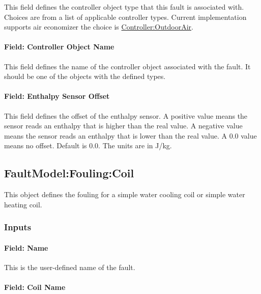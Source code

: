 This field defines the controller object type that this fault is associated with. Choices are from a list of applicable controller types. Current implementation supports air economizer the choice is \hyperref[controlleroutdoorair]{Controller:OutdoorAir}.

\paragraph{Field: Controller Object Name}\label{field-controller-object-name-4}

This field defines the name of the controller object associated with the fault. It should be one of the objects with the defined types.

\paragraph{Field: Enthalpy Sensor Offset}\label{field-enthalpy-sensor-offset-1}

This field defines the offset of the enthalpy sensor. A positive value means the sensor reads an enthalpy that is higher than the real value. A negative value means the sensor reads an enthalpy that is lower than the real value. A 0.0 value means no offset. Default is 0.0. The units are in J/kg.

\subsection{FaultModel:Fouling:Coil}\label{faultmodelfoulingcoil}

This object defines the fouling for a simple water cooling coil or simple water heating coil.

\subsubsection{Inputs}\label{inputs-5-018}

\paragraph{Field: Name}\label{field-name-5-014}

This is the user-defined name of the fault.

\paragraph{Field: Coil Name}\label{field-coil-name-001}

